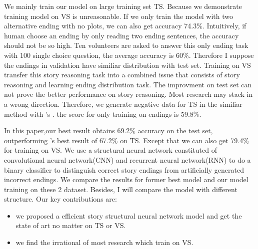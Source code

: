 We mainly train our model on large training set TS. Because we demonstrate training model on VS is unreasonable. If we only train the model with two alternative ending with no plots, we can also get accuracy 74.3\%. Intuitively, if human choose an ending by only reading two ending sentences, the accuracy should not be so high. Ten volunteers are asked to answer this only ending task with 100 single choice question, the average accuracy is 60\%. Therefore I suppose the endings in validation have similiar distribution with test set. Training on VS transfer this story reasoning task into a combined issue that consists of story reasoning and learning ending distribution task. The improvment on test set can not prove the better performance on story reasoning. Most research may stack in a wrong direction. Therefore, we generate negative data for TS in the similiar method with \citeauthor{roemmele2017rnn}'s . the score for only training on endings is 59.8\%. 
%

In this paper,our best result obtains 69.2\% accuracy on the test set, outperforming \citeauthor{roemmele2017rnn}'s best result of 67.2\% on TS. Except that we can also get 79.4\% for training on VS. We use a structural neural network constituted of convolutional neural network(CNN) and recurrent neural network(RNN) to do a binary classifier to distinguish correct story endings from artificially generated incorrect endings. We compare the results for former  best model and our model training on these 2 dataset. Besides, I will compare the model with different structure.
%
Our key contributions are:
%
\begin{itemize}
	\item we proposed a efficient story structural neural network model and get the state of art no matter on TS or VS.
	\item we find the irrational of most research which train on VS.
\end{itemize}
%










